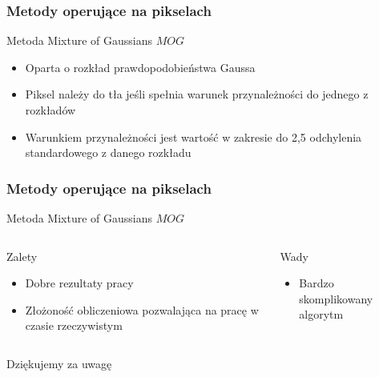 \documentclass{beamer}
\begin{document}
\begin{frame}
\frametitle{Metody operujące na pikselach}
\begin{block}{Metoda Mixture of Gaussians \(MOG\)}
\begin{itemize}
\item Oparta o rozkład prawdopodobieństwa Gaussa
\item Piksel należy do tła jeśli spełnia warunek przynależności do jednego z rozkładów
\item Warunkiem przynależności jest wartość w zakresie do 2,5 odchylenia standardowego z danego rozkładu
\end{itemize}
\end{block}

\end{frame}






\begin{frame}
\frametitle{Metody operujące na pikselach}
\begin{block}{Metoda Mixture of Gaussians \(MOG\)}
\begin{columns}
\begin{block}{Zalety}
\begin{itemize}
\item Dobre rezultaty pracy
\item Złożoność obliczeniowa pozwalająca na pracę w czasie rzeczywistym
\end{itemize}
\end{block}
\begin{block}{Wady}
\begin{itemize}
\item Bardzo skomplikowany algorytm
\end{itemize}
\end{block}
\end{columns}
\end{block}




\end{frame}

\begin{frame}

\begin{center}

\Huge{Dziękujemy za uwagę}
\end{center}
\end{frame}
\end{document}
